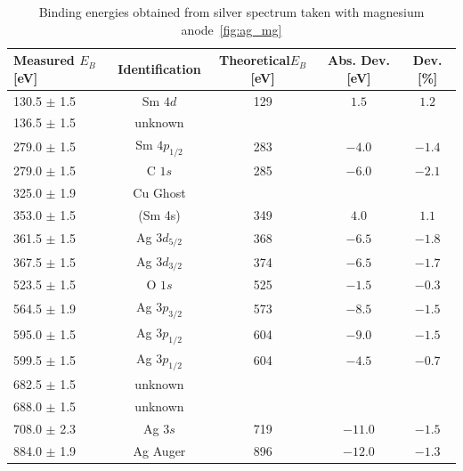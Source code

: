 \documentclass[a4paper,10pt]{scrartcl}
\begin{document}
\begin{table}
\begin{center}
\begin{tabular}{lcccc}
\toprule
Measured $E_{B}$ [eV]        & Identification & Theoretical$E_{B}$ [eV] & Abs. Dev. [eV] & Dev. [\%]\\
\midrule
130.5 $\pm$ 1.5              & Sm $4d$        & 129                     & $1.5$          & $1.2$ \\
136.5 $\pm$ 1.5              & unknown        &                         &                &       \\
279.0 $\pm$ 1.5              & Sm $4p_{1/2}$  & 283                     & $-4.0$         & $-1.4$\\
279.0 $\pm$ 1.5              & C $1s$         & 285                     & $-6.0$         & $-2.1$\\
325.0 $\pm$ 1.9              & Cu Ghost       &                         &                &       \\
353.0 $\pm$ 1.5              & (Sm 4s)        & 349                     & $4.0$          & $1.1$ \\
361.5 $\pm$ 1.5              & Ag $3d_{5/2}$  & 368                     & $-6.5$         & $-1.8$\\
367.5 $\pm$ 1.5              & Ag $3d_{3/2}$  & 374                     & $-6.5$         & $-1.7$\\
523.5 $\pm$ 1.5              & O $1s$         & 525                     & $-1.5$         & $-0.3$\\
564.5 $\pm$ 1.9              & Ag $3p_{3/2}$  & 573                     & $-8.5$         & $-1.5$\\
595.0 $\pm$ 1.5              & Ag $3p_{1/2}$  & 604                     & $-9.0$         & $-1.5$\\
599.5 $\pm$ 1.5              & Ag $3p_{1/2}$  & 604                     & $-4.5$         & $-0.7$\\
682.5 $\pm$ 1.5              & unknown        &                         &                &       \\
688.0 $\pm$ 1.5              & unknown        &                         &                &       \\
708.0 $\pm$ 2.3              & Ag $3s$        & 719                     & $-11.0$        & $-1.5$\\
884.0 $\pm$ 1.9              & Ag Auger       & 896                     & $-12.0$        & $-1.3$\\
\bottomrule
\end{tabular}
\end{center}
\par
\caption{Binding energies obtained from silver spectrum taken with magnesium anode~\ref{fig:ag_mg} \label{tab:ag_mg_ident}}
\end{table}
\end{document}
